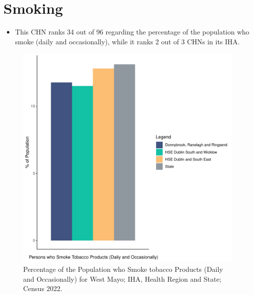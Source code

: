 \documentclass{article}
\begin{document}
\pagebreak

\section{Smoking}\label{sect:Smoking}
\begin{itemize}
\item This CHN ranks  34 out of 96 regarding the percentage of the population who smoke (daily and occasionally), while it ranks   2 out of 3 CHNs in its IHA.
\end{itemize}
\begin{figure}[H]
	\centering
	\includegraphics[width = 120mm]{../figures/SmokingED.pdf}
	\caption{Percentage of the Population who Smoke tobacco Products (Daily and Occasionally) for West Mayo; IHA, Health Region and State; Census 2022.}
	\label{fig:2ae19629-1a6a-13a3-e055-000000000001}
	\end{figure}
	
\end{document}
